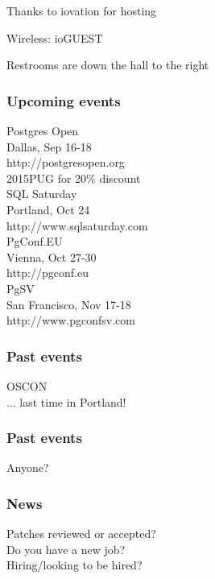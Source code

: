 \documentclass{beamer}
\begin{document}

\frame
{
  \begin{center}
  \item[]Thanks to iovation for hosting
  \item[]Wireless: ioGUEST
  \item[]Restrooms are down the hall to the right
  \end{center}
}

\frame
{
  \frametitle{Upcoming events}
  \begin{center}
{\large Postgres Open\\}
Dallas, Sep 16-18\\
http://postgresopen.org\\
2015PUG for 20\% discount\\
\vspace{5 mm}
{\large SQL Saturday\\}
Portland, Oct 24\\
http://www.sqlsaturday.com\\
\vspace{5 mm}
{\large PgConf.EU\\}
Vienna, Oct 27-30\\
http://pgconf.eu\\
\vspace{5 mm}
{\large PgSV\\}
San Francisco, Nov 17-18\\
http://www.pgconfsv.com\\
  \end{center}
}

\frame
{
  \frametitle{Past events}
  \begin{center}
{\large OSCON\\}
... last time in Portland!\\
\vspace{5 mm}
  \end{center}
}


\frame
{
  \frametitle{Past events}
  \begin{center}
Anyone?\\
  \end{center}
}

\frame
{
  \frametitle{News}
  \begin{center}
Patches reviewed or accepted?\\
Do you have a new job?\\
Hiring/looking to be hired?\\
  \end{center}
}
\end{document}
